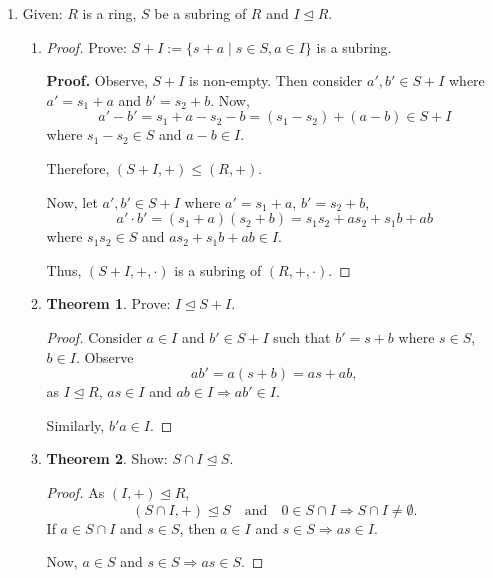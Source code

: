 \documentclass[11pt]{article}
\theoremstyle{definition}
\newtheorem{theorem}{Theorem}[section]
\theoremstyle{remark}
\begin{document}
\begin{enumerate}
    \item Given: $R$ is a ring, $S$ be a subring of $R$ and $I \trianglelefteq R$.

    \begin{enumerate}
        \item[(a)]
        \begin{proof}
            Prove: $S + I := \{ s + a \mid s \in S, a \in I \}$ is a subring.

            \textbf{Proof.} Observe, $S + I$ is non-empty. Then consider $a', b' \in S + I$ where $a' = s_1 + a$ and $b' = s_2 + b$. Now,
            \[
            a' - b' = s_1 + a - s_2 - b = (s_1 - s_2) + (a - b) \in S + I
            \]
            where $s_1 - s_2 \in S$ and $a - b \in I$.

            Therefore, $(S + I, +) \leq (R, +)$.

            Now, let $a', b' \in S + I$ where $a' = s_1 + a$, $b' = s_2 + b$,
            \[
            a' \cdot b' = (s_1 + a)(s_2 + b) = s_1 s_2 + a s_2 + s_1 b + a b
            \]
            where $s_1 s_2 \in S$ and $a s_2 + s_1 b + a b \in I$.

            Thus, $(S + I, +, \cdot)$ is a subring of $(R, +, \cdot)$.
        \end{proof}

        \item[(b)]
        \begin{theorem}\label{thm:ideal_subset}
            Prove: $I \trianglelefteq S + I$.
        \end{theorem}
        \begin{proof}
            Consider $a \in I$ and $b' \in S + I$ such that $b' = s + b$ where $s \in S$, $b \in I$. Observe
            \[
            a b' = a(s + b) = a s + a b,
            \]
            as $I \trianglelefteq R$, $a s \in I$ and $a b \in I \Rightarrow a b' \in I$.

            Similarly, $b' a \in I$.
        \end{proof}

        \item[(c)]
        \begin{theorem}\label{thm:intersection_subring}
            Show: $S \cap I \trianglelefteq S$.
        \end{theorem}
        \begin{proof}
            As $(I, +) \trianglelefteq R$,
            \[
            (S \cap I, +) \trianglelefteq S \quad \text{and} \quad 0 \in S \cap I \Rightarrow S \cap I \neq \emptyset.
            \]
            If $a \in S \cap I$ and $s \in S$, then $a \in I$ and $s \in S \Rightarrow a s \in I$.

            Now, $a \in S$ and $s \in S \Rightarrow a s \in S$.
        \end{proof}
    \end{enumerate}
\end{enumerate}
\end{document}
